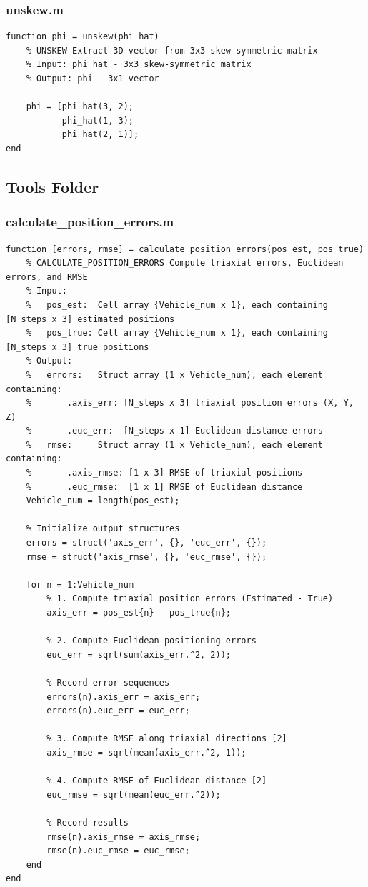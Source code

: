 \documentclass[twocolumn,10pt]{article}
\begin{document}
\subsubsection{unskew.m}
\begin{lstlisting}
function phi = unskew(phi_hat)
    % UNSKEW Extract 3D vector from 3x3 skew-symmetric matrix
    % Input: phi_hat - 3x3 skew-symmetric matrix
    % Output: phi - 3x1 vector
    
    phi = [phi_hat(3, 2); 
           phi_hat(1, 3); 
           phi_hat(2, 1)];
end
\end{lstlisting}

\subsection{Tools Folder}

\subsubsection{calculate\_position\_errors.m}
\begin{lstlisting}
function [errors, rmse] = calculate_position_errors(pos_est, pos_true)
    % CALCULATE_POSITION_ERRORS Compute triaxial errors, Euclidean errors, and RMSE
    % Input:
    %   pos_est:  Cell array {Vehicle_num x 1}, each containing [N_steps x 3] estimated positions
    %   pos_true: Cell array {Vehicle_num x 1}, each containing [N_steps x 3] true positions
    % Output:
    %   errors:   Struct array (1 x Vehicle_num), each element containing:
    %       .axis_err: [N_steps x 3] triaxial position errors (X, Y, Z)
    %       .euc_err:  [N_steps x 1] Euclidean distance errors
    %   rmse:     Struct array (1 x Vehicle_num), each element containing:
    %       .axis_rmse: [1 x 3] RMSE of triaxial positions
    %       .euc_rmse:  [1 x 1] RMSE of Euclidean distance
    Vehicle_num = length(pos_est);
    
    % Initialize output structures
    errors = struct('axis_err', {}, 'euc_err', {});
    rmse = struct('axis_rmse', {}, 'euc_rmse', {});
    
    for n = 1:Vehicle_num
        % 1. Compute triaxial position errors (Estimated - True)
        axis_err = pos_est{n} - pos_true{n};
        
        % 2. Compute Euclidean positioning errors
        euc_err = sqrt(sum(axis_err.^2, 2));
        
        % Record error sequences
        errors(n).axis_err = axis_err;
        errors(n).euc_err = euc_err;
        
        % 3. Compute RMSE along triaxial directions [2]
        axis_rmse = sqrt(mean(axis_err.^2, 1));
        
        % 4. Compute RMSE of Euclidean distance [2]
        euc_rmse = sqrt(mean(euc_err.^2));
        
        % Record results
        rmse(n).axis_rmse = axis_rmse;
        rmse(n).euc_rmse = euc_rmse;
    end
end
\end{lstlisting}
\end{document}

